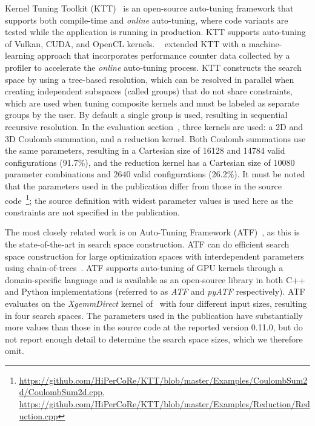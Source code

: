 Kernel Tuning Toolkit (KTT)~\cite{KTT} is an open-source auto-tuning framework that supports both compile-time and \textit{online} auto-tuning, where code variants are tested while the application is running in production. KTT supports auto-tuning of Vulkan, CUDA, and OpenCL kernels. \citeauthor{filipovicUsingHardwarePerformance2022}~\cite{filipovicUsingHardwarePerformance2022} extended KTT with a machine-learning approach that incorporates performance counter data collected by a profiler to accelerate the \textit{online} auto-tuning process. 
KTT constructs the search space by using a tree-based resolution, which can be resolved in parallel when creating independent subspaces (called groups) that do not share constraints, which are used when tuning composite kernels and must be labeled as separate groups by the user. By default a single group is used, resulting in sequential recursive resolution. 
\ifrelatedworktable
\else
In the evaluation section~\cite{KTT}, three kernels are used: a 2D and 3D Coulomb summation, and a reduction kernel. Both Coulomb summations use the same parameters, resulting in a Cartesian size of 16128 and 14784 valid configurations (91.7\%), and the reduction kernel has a Cartesian size of 10080 parameter combinations and 2640 valid configurations (26.2\%). It must be noted that the parameters used in the publication differ from those in the source code~\footnote{\url{https://github.com/HiPerCoRe/KTT/blob/master/Examples/CoulombSum2d/CoulombSum2d.cpp}, \url{https://github.com/HiPerCoRe/KTT/blob/master/Examples/Reduction/Reduction.cpp}}; the source definition with widest parameter values is used here as the constraints are not specified in the publication.
\fi

The most closely related work is on Auto-Tuning Framework (ATF)~\cite{ATF,ATF2}, as this is the state-of-the-art in search space construction. ATF can do efficient search space construction for large optimization spaces with interdependent parameters using chain-of-trees~\cite{ATF2}. 
ATF supports auto-tuning of GPU kernels through a domain-specific language and is available as an open-source library in both C++ and Python implementations (referred to as \textit{ATF} and \textit{pyATF} respectively). 
\ifrelatedworktable
\else
ATF~\cite{ATF} evaluates on the \textit{XgemmDirect} kernel of~\cite{CLBlast2018} with four different input sizes, resulting in four search spaces. The parameters used in the publication have substantially more values than those in the source code at the reported version 0.11.0, but do not report enough detail to determine the search space sizes, which we therefore omit. 
\fi

